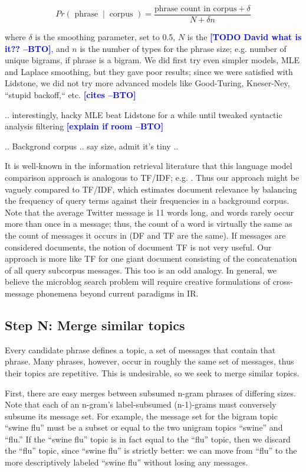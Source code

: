 \documentclass[letterpaper]{article}
\newcommand{\bto}[1]{\textcolor{blue}{\textbf{[#1 --BTO]}}}
\newcommand{\codenote}[1]{}
\begin{document}
\[ Pr(\textrm{ phrase }\ |\ \textrm{ corpus }) = \frac
{ \textrm{phrase count in corpus} + \delta }
{ N + \delta n   }
\]

where $\delta$ is the smoothing parameter, set to 0.5, $N$ is the \bto{TODO David what is it??}, and $n$ is the number of types for the phrase size; e.g. number of unique bigrams, if phrase is a bigram.  We did first try even simpler models, MLE and Laplace smoothing, but they gave poor results; since we were satisfied with Lidstone, we did not try more advanced models like Good-Turing, Kneser-Ney, ``stupid backoff,`` etc. \bto{cites}

.. interestingly, hacky MLE beat Lidstone for a while until tweaked syntactic analysis filtering \bto{explain if room}

.. Backgrond corpus .. say size, admit it's tiny ..

It is well-known in the information retrieval literature that this  language model comparison approach is analogous to TF/IDF; e.g. \cite{manning_introduction_2008}.  Thus our approach might be vaguely compared to TF/IDF, which estimates document relevance by balancing the frequency of query terms against their frequencies in a background corpus.  Note that the average Twitter message is 11 words long, and words rarely occur more than once in a message; thus, the count of a word is virtually the same as the count of messages it occurs in (DF and TF are the same).  If messages are considered documents, the notion of document TF is not very useful.  Our approach is more like TF for one giant document consisting of the concatenation of all query subcorpus messages.  This too is an odd analogy.  In general, we believe the microblog search problem will require creative formulations of cross-message phonemena beyond current paradigms in IR.

\subsection{Step N: Merge similar topics}

\codenote{ deduper.py }
Every candidate phrase defines a topic, a set of messages that contain that phrase.  Many phrases, however, occur in roughly the same set of messages, thus their topics are repetitive.  This is undesirable, so we seek to merge similar topics.

First, there are easy merges between subsumed n-gram phrases of differing sizes.  Note that each of an n-gram's label-subsumed (n-1)-grams must conversely subsume its message set.  For example, the message set for the bigram topic ``swine flu'' must be a subset or equal to the two unigram topics ``swine'' and ``flu.''  If the ``swine flu'' topic is in fact equal to the ``flu'' topic, then we discard the ``flu'' topic, since ``swine flu'' is strictly better: we can move from ``flu'' to the more descriptively labeled ``swine flu'' without losing any messages.
\end{document}
